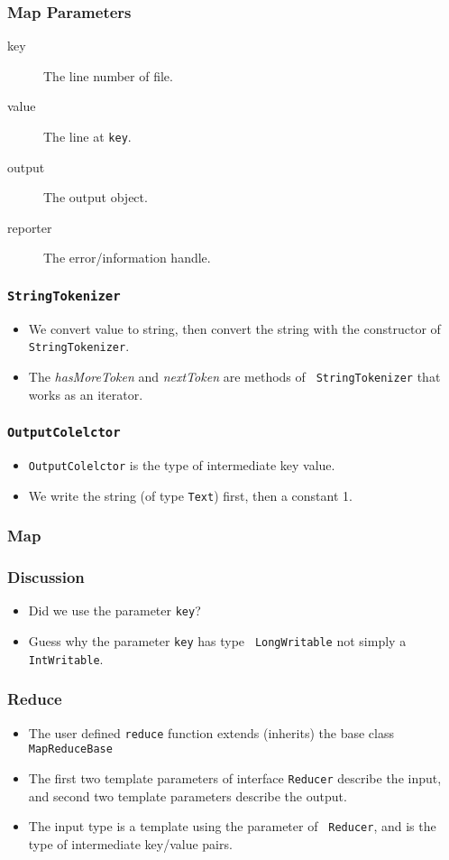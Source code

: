 \documentclass{beamer}
\begin{document}
\begin{frame}
  \frametitle{Map Parameters}
  \begin{description}
    \item[key] The line number of file.
    \item[value] The line at {\tt key}.
    \item[output] The output object.
    \item[reporter] The error/information handle.
  \end{description}
\end{frame}

\begin{frame}
  \frametitle{\tt StringTokenizer}
  \begin{itemize}
  \item We convert value to string, then convert the string with the
    constructor of {\tt StringTokenizer}.
  \item The {\em hasMoreToken} and {\em nextToken} are methods of {\tt
    StringTokenizer} that works as an iterator.
  \end{itemize}
\end{frame}

\begin{frame}
  \frametitle{\tt OutputColelctor}
  \begin{itemize}
  \item {\tt OutputColelctor} is the type of intermediate key value.
  \item We write the string (of type {\tt Text}) first, then a constant
    1.
  \end{itemize}
\end{frame}

\begin{frame}
  \frametitle{Map}
\end{frame}

\begin{frame}
  \frametitle{Discussion}
  \begin{itemize}
    \item Did we use the parameter {\tt key}?
    \item Guess why the parameter {\tt key} has type {\tt
      LongWritable} not simply a {\tt IntWritable}.
  \end{itemize}
\end{frame}

\begin{frame}
  \frametitle{Reduce}
  \begin{itemize}
    \item The user defined {\tt reduce} function extends (inherits)
      the base class {\tt MapReduceBase}
    \item The first two template parameters of interface {\tt Reducer}
      describe the input, and second two template parameters describe
      the output.
    \item The input type is a template using the parameter of {\tt
      Reducer}, and is the type of intermediate key/value pairs.

  \end{itemize}
\end{frame}
\end{document}
